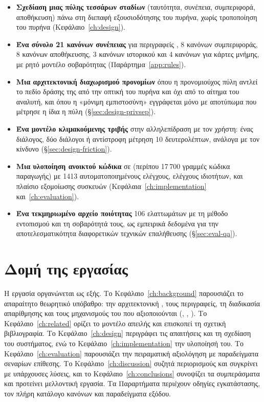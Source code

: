 \begin{itemize}
  \item \textbf{Σχεδίαση μιας πύλης τεσσάρων σταδίων} (ταυτότητα, συνέπεια,
        συμπεριφορά, αποθήκευση) πάνω στη διεπαφή εξουσιοδότησης του πυρήνα,
        χωρίς τροποποίηση του πυρήνα (Κεφάλαιο~\ref{ch:design}).
  \item \textbf{Ένα σύνολο 21 κανόνων συνέπειας} για περιγραφείς ,
        8 κανόνων συμπεριφοράς, 8 κανόνων αποθήκευσης, 3 κανόνων ιστορικού
        και 4 κανόνων για κάρτες μνήμης, με ρητό μοντέλο σοβαρότητας
        (Παράρτημα~\ref{app:rules}).
  \item \textbf{Μια αρχιτεκτονική διαχωρισμού προνομίων} όπου η προνομιούχος
        πύλη αντλεί το πεδίο δράσης της από την οπτική του πυρήνα και όχι από το
        αίτημα του αναλυτή, και όπου η «μόνιμη εμπιστοσύνη» εγγράφεται μόνο με
        αποτύπωμα που μέτρησε η ίδια η πύλη (§\ref{sec:design-privsep}).
  \item \textbf{Ένα μοντέλο κλιμακούμενης τριβής} στην αλληλεπίδραση με τον
        χρήστη: ένας διάλογος, δύο διάλογοι ή αντίστροφη μέτρηση 10 δευτερολέπτων,
        ανάλογα με τον κίνδυνο (§\ref{sec:design-friction}).
  \item \textbf{Μια υλοποίηση ανοικτού κώδικα} σε  (περίπου 17\,700
        γραμμές κώδικα παραγωγής) με 1413 αυτοματοποιημένους ελέγχους,
        ελέγχους ιδιοτήτων,  και πλαίσιο εξομοίωσης συσκευών
        (Κεφάλαια~\ref{ch:implementation} και~\ref{ch:evaluation}).
  \item \textbf{Ένα τεκμηριωμένο αρχείο ποιότητας} 106 ελαττωμάτων με τη μέθοδο
        εντοπισμού και τη σοβαρότητά τους, ως εμπειρικά δεδομένα για την
        αποτελεσματικότητα διαφορετικών τεχνικών επαλήθευσης (§\ref{sec:eval-qa}).
\end{itemize}

\section{Δομή της εργασίας}
\label{sec:structure}

Η εργασία οργανώνεται ως εξής. Το Κεφάλαιο~\ref{ch:background} παρουσιάζει το
απαραίτητο θεωρητικό υπόβαθρο: την αρχιτεκτονική , τους περιγραφείς, τη
διαδικασία απαρίθμησης και τους μηχανισμούς του  που αξιοποιούνται
(, , ). Το Κεφάλαιο~\ref{ch:related} ορίζει το μοντέλο
απειλής και επισκοπεί τη σχετική βιβλιογραφία. Το Κεφάλαιο~\ref{ch:design}
περιγράφει τις απαιτήσεις και τη σχεδίαση του συστήματος, ενώ το
Κεφάλαιο~\ref{ch:implementation} την υλοποίησή του. Το Κεφάλαιο~\ref{ch:evaluation}
παρουσιάζει την πειραματική αξιολόγηση με παραδείγματα σεναρίων επίθεσης. Το
Κεφάλαιο~\ref{ch:discussion} συζητά περιορισμούς και συγκρίνει με υπάρχουσες
λύσεις, και το Κεφάλαιο~\ref{ch:conclusions} συνοψίζει τα συμπεράσματα και
προτείνει μελλοντική εργασία. Τα Παραρτήματα περιέχουν οδηγίες εγκατάστασης, τον
πλήρη κατάλογο κανόνων και παραδείγματα εξόδου.
